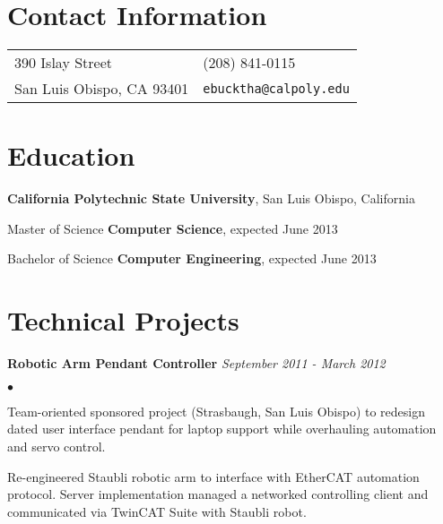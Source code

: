 \documentclass[margin,line]{res}
\newenvironment{list1}{
    \begin{list}{\ding{113}}{%
      \setlength{\itemsep}{0in}
        \setlength{\parsep}{0in} \setlength{\parskip}{0in}
        \setlength{\topsep}{0in} \setlength{\partopsep}{0in}
    \setlength{\leftmargin}{0.17in}}}{\end{list}}
\newenvironment{list2}{
      \begin{list}{$\bullet$}{%
        \setlength{\itemsep}{0in}
          \setlength{\parsep}{0in} \setlength{\parskip}{0in}
          \setlength{\topsep}{0in} \setlength{\partopsep}{0in}
      \setlength{\leftmargin}{0.2in}}}{\end{list}}
\begin{document}

      \begin{resume}
        \section{\sc Contact Information}
        \vspace{.05in}
        \begin{tabular}{@{}p{2in}p{4in}}
          390 Islay Street           & (208) 841-0115\\
          San Luis Obispo, CA 93401  & {\tt ebucktha@calpoly.edu} \\
        \end{tabular}

        \section{\sc Education}
        {\bf California Polytechnic State University}, San Luis Obispo, California\\
        \vspace*{-.1in}
        \begin{list1}
        \item[] Master of Science {\bf Computer Science}, expected June 2013
          \vspace*{.05in}
        \item[] Bachelor of Science {\bf Computer Engineering}, expected June 2013
        \end{list1}

        \section{\sc Technical Projects}
        {\bf Robotic Arm Pendant Controller} \hfill {\em September 2011 - March 2012}\\
        \begin{list2}
        \item Team-oriented sponsored project (Strasbaugh, San Luis Obispo) to redesign dated user interface pendant for laptop support while overhauling automation and servo control. 
        \item Re-engineered Staubli robotic arm to interface with {\sc EtherCAT} automation protocol. Server implementation managed a networked controlling client and communicated via {\sc TwinCAT} Suite with Staubli robot.
        \end{list2}


\end{resume}
\end{document}
